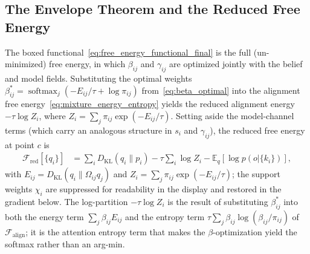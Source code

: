 \documentclass[11pt]{article}
\providecommand{\softmax}{\operatorname{softmax}}
\begin{document}
\subsection{The Envelope Theorem and the Reduced Free Energy}
\label{sec:envelope_theorem}

The boxed functional~\eqref{eq:free_energy_functional_final} is the full (un-minimized) free energy, in which $\beta_{ij}$ and $\gamma_{ij}$ are optimized jointly with the belief and model fields. Substituting the optimal weights $\beta_{ij}^* = \softmax_j(-E_{ij}/\tau + \log\pi_{ij})$ from~\eqref{eq:beta_optimal} into the alignment free energy~\eqref{eq:mixture_energy_entropy} yields the reduced alignment energy $-\tau\log Z_i$, where $Z_i = \sum_j \pi_{ij}\exp(-E_{ij}/\tau)$. Setting aside the model-channel terms (which carry an analogous structure in $s_i$ and $\gamma_{ij}$), the reduced free energy at point $c$ is
\begin{equation}
\boxed{
\begin{aligned}
\mathcal{F}_{\mathrm{red}}[\{q_i\}]
&=\sum_i D_{\mathrm{KL}}(q_i\|p_i)
-\tau\sum_i \log Z_i
-\mathbb{E}_q[\log p(o|\{k_i\})],
\end{aligned}
}
\label{eq:free_energy_reduced}
\end{equation}
with $E_{ij} = D_{\mathrm{KL}}(q_i \| \Omega_{ij} q_j)$ and $Z_i = \sum_j \pi_{ij} \exp(-E_{ij}/\tau)$; the support weights $\chi_i$ are suppressed for readability in the display and restored in the gradient below. The log-partition $-\tau\log Z_i$ is the result of substituting $\beta_{ij}^*$ into both the energy term $\sum_j \beta_{ij} E_{ij}$ and the entropy term $\tau\sum_j \beta_{ij}\log(\beta_{ij}/\pi_{ij})$ of $\mathcal{F}_{\text{align}}$; it is the attention entropy term that makes the $\beta$-optimization yield the softmax rather than an arg-min.
\end{document}
